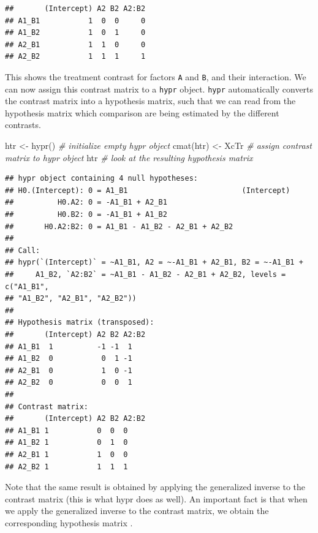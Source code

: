 \documentclass[
  12pt,
]{krantz}
\newenvironment{Shaded}{\begin{snugshade}}{\end{snugshade}}
\newcommand{\CommentTok}[1]{\textcolor[rgb]{0.56,0.35,0.01}{\textit{#1}}}
\newcommand{\FunctionTok}[1]{\textcolor[rgb]{0.00,0.00,0.00}{#1}}
\newcommand{\NormalTok}[1]{#1}
\newcommand{\OtherTok}[1]{\textcolor[rgb]{0.56,0.35,0.01}{#1}}
\theoremstyle{definition}
\theoremstyle{definition}
\theoremstyle{definition}
\theoremstyle{definition}
\theoremstyle{remark}
\begin{document}
\begin{verbatim}
##       (Intercept) A2 B2 A2:B2
## A1_B1           1  0  0     0
## A1_B2           1  0  1     0
## A2_B1           1  1  0     0
## A2_B2           1  1  1     1
\end{verbatim}

This shows the treatment contrast for factors \texttt{A} and \texttt{B}, and their interaction. We can now assign this contrast matrix to a \texttt{hypr} object. \texttt{hypr} automatically converts the contrast matrix into a hypothesis matrix, such that we can read from the hypothesis matrix which comparison are being estimated by the different contrasts.

\begin{Shaded}
\begin{Highlighting}[]
\NormalTok{htr }\OtherTok{\textless{}{-}} \FunctionTok{hypr}\NormalTok{() }\CommentTok{\# initialize empty hypr object}
\FunctionTok{cmat}\NormalTok{(htr) }\OtherTok{\textless{}{-}}\NormalTok{ XcTr }\CommentTok{\# assign contrast matrix to hypr object}
\NormalTok{htr }\CommentTok{\# look at the resulting hypothesis matrix}
\end{Highlighting}
\end{Shaded}

\begin{verbatim}
## hypr object containing 4 null hypotheses:
## H0.(Intercept): 0 = A1_B1                          (Intercept)
##          H0.A2: 0 = -A1_B1 + A2_B1
##          H0.B2: 0 = -A1_B1 + A1_B2
##       H0.A2:B2: 0 = A1_B1 - A1_B2 - A2_B1 + A2_B2
## 
## Call:
## hypr(`(Intercept)` = ~A1_B1, A2 = ~-A1_B1 + A2_B1, B2 = ~-A1_B1 + 
##     A1_B2, `A2:B2` = ~A1_B1 - A1_B2 - A2_B1 + A2_B2, levels = c("A1_B1", 
## "A1_B2", "A2_B1", "A2_B2"))
## 
## Hypothesis matrix (transposed):
##       (Intercept) A2 B2 A2:B2
## A1_B1  1          -1 -1  1   
## A1_B2  0           0  1 -1   
## A2_B1  0           1  0 -1   
## A2_B2  0           0  0  1   
## 
## Contrast matrix:
##       (Intercept) A2 B2 A2:B2
## A1_B1 1           0  0  0    
## A1_B2 1           0  1  0    
## A2_B1 1           1  0  0    
## A2_B2 1           1  1  1
\end{verbatim}

Note that the same result is obtained by applying the generalized inverse to the contrast matrix (this is what hypr does as well). An important fact is that when we apply the generalized inverse to the contrast matrix, we obtain the corresponding hypothesis matrix \citep[for details see][]{schad2020capitalize}.
\end{document}
